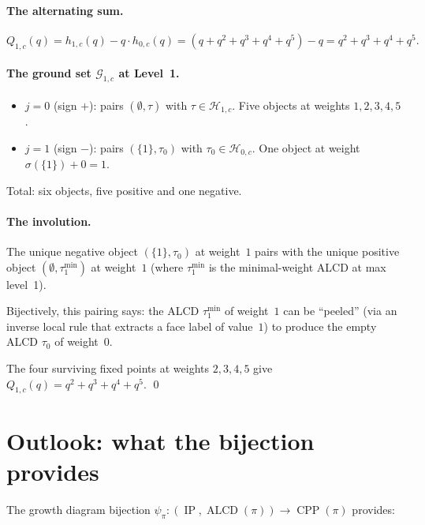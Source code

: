 \documentclass[11pt]{article}
\newcommand{\CPP}{\operatorname{CPP}}
\newcommand{\IP}{\operatorname{IP}}
\newcommand{\ALCD}{\operatorname{ALCD}}
\theoremstyle{plain}
\theoremstyle{definition}
\begin{document}
\paragraph{The alternating sum.}
\[
  Q_{1,c}(q) = h_{1,c}(q) - q \cdot h_{0,c}(q)
  = (q + q^2 + q^3 + q^4 + q^5) - q = q^2 + q^3 + q^4 + q^5.
\]

\paragraph{The ground set $\mathcal{G}_{1,c}$ at Level~1.}
\begin{itemize}
  \item $j = 0$ (sign $+$): pairs $(\emptyset, \tau)$ with
    $\tau \in \mathcal{H}_{1,c}$.
    Five objects at weights $1, 2, 3, 4, 5$.
  \item $j = 1$ (sign $-$): pairs $(\{1\}, \tau_0)$ with
    $\tau_0 \in \mathcal{H}_{0,c}$.
    One object at weight $\sigma(\{1\}) + 0 = 1$.
\end{itemize}

Total: six objects, five positive and one negative.

\paragraph{The involution.}
The unique negative object $(\{1\}, \tau_0)$ at weight~$1$ pairs with
the unique positive object $(\emptyset, \tau_1^{\min})$ at weight~$1$
(where $\tau_1^{\min}$ is the minimal-weight ALCD at max level~1).

Bijectively, this pairing says: the ALCD $\tau_1^{\min}$ of weight~$1$
can be ``peeled'' (via an inverse local rule that extracts a face label
of value~$1$) to produce the empty ALCD $\tau_0$ of weight~$0$.

The four surviving fixed points at weights $2, 3, 4, 5$ give
$Q_{1,c}(q) = q^2 + q^3 + q^4 + q^5$. \qed


\section{Outlook: what the bijection provides}
\label{sec:outlook}

The growth diagram bijection
$\psi_\pi\colon (\IP, \ALCD(\pi)) \to \CPP(\pi)$ provides:
\end{document}
